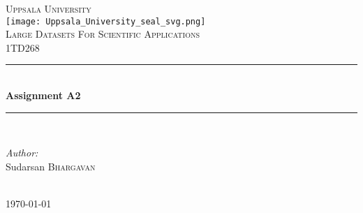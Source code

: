 \documentclass[12pt]{article}
\begin{document}
\begin{titlepage}

\newcommand{\HRule}{\rule{\linewidth}{0.5mm}} %

\center %
 

\textsc{\LARGE Uppsala University}\\[1.5cm] %
\texttt{[image: Uppsala\_University\_seal\_svg.png]}\\[1cm] %
\textsc{\Large Large Datasets For Scientific Applications}\\[0.5cm] %
\textsc{\large 1TD268}\\[0.5cm] %


\HRule \\[0.4cm]
{ \huge \bfseries Assignment A2}\\[0.4cm] %
\HRule \\[1.5cm]
 

\begin{minipage}{0.4\textwidth}
\begin{flushleft} \large
\emph{Author:}\\
Sudarsan \textsc{Bhargavan}\\ %
\end{flushleft}

\end{minipage}\\[2cm]



{\large \today}\\[2cm] %

\vfill %

\end{titlepage}
\end{document}
